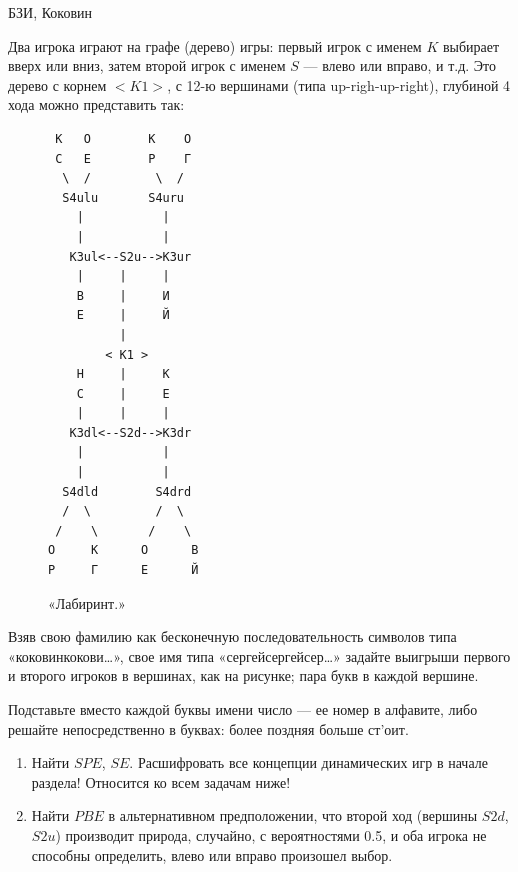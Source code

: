 \begin{problem}[«Лабиринт».]
\begin{source}
БЗИ, Коковин
\end{source}  Два игрока играют на графе
(дерево) игры: первый игрок с именем $K$ выбирает вверх или
вниз, затем второй игрок с именем $S$ — влево или вправо, и
т.д. Это дерево с корнем $<K1>$, с 12-ю вершинами (типа
up-righ-up-right), глубиной 4 хода можно представить так:

\begin{figure}[ht]
\begin{verbatim}
 К   О        К    О
 С   Е        Р    Г
  \  /         \  /
  S4ulu       S4uru
    |           |
    |           |
   K3ul<--S2u-->K3ur
    |     |     |
    В     |     И
    Е     |     Й
          |
        < K1 >
    Н     |     К
    С     |     Е
    |     |     |
   K3dl<--S2d-->K3dr
    |           |
    |           |
  S4dld        S4drd
  /  \         /  \
 /    \       /    \
О     К      О      В
Р     Г      Е      Й
\end{verbatim}
\caption{«Лабиринт.»}
\end{figure}

Взяв свою фамилию как бесконечную последовательность символов
типа «коковинкокови\ldots », свое имя типа
«сергейсергейсер\ldots » задайте выигрыши первого и второго
игроков в вершинах, как на рисунке; пара букв в каждой
вершине.

Подставьте вместо каждой буквы имени число — ее номер в
алфавите, либо решайте непосредственно в буквах: более
поздняя больше ст'оит.

\begin{enumerate}

\item Найти $SPE$, $SE$. {\red Расшифровать все концепции динамических игр в начале раздела! Относится ко всем задачам ниже!}

\item Найти $PBE$ в альтернативном
предположении, что второй ход (вершины $S2d$, $S2u$)
производит природа, случайно, с вероятностями 0.5, и оба
игрока не способны определить, влево или вправо произошел
выбор.
\end{enumerate}





\begin{sol}

\end{sol}
\end{problem}






